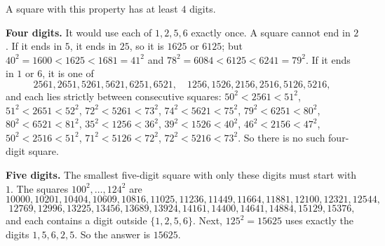 A square with this property has at least $4$ digits.

\textbf{Four digits.} It would use each of $1,2,5,6$ exactly once. A square cannot end in $2$. If it ends in $5$, it ends in $25$, so it is $1625$ or $6125$; but $40^2=1600<1625<1681=41^2$ and $78^2=6084<6125<6241=79^2$. If it ends in $1$ or $6$, it is one of
\[
2561,2651,5261,5621,6251,6521,\quad 1256,1526,2156,2516,5126,5216,
\]
and each lies strictly between consecutive squares:
$50^2<2561<51^2$, $51^2<2651<52^2$, $72^2<5261<73^2$, $74^2<5621<75^2$, $79^2<6251<80^2$, $80^2<6521<81^2$, $35^2<1256<36^2$, $39^2<1526<40^2$, $46^2<2156<47^2$, $50^2<2516<51^2$, $71^2<5126<72^2$, $72^2<5216<73^2$. So there is no such four-digit square.

\textbf{Five digits.} The smallest five-digit square with only these digits must start with $1$. The squares $100^2,\dots,124^2$ are
\[
10000,10201,10404,10609,10816,11025,11236,11449,11664,11881,12100,12321,12544,
\]
\[
12769,12996,13225,13456,13689,13924,14161,14400,14641,14884,15129,15376,
\]
and each contains a digit outside $\{1,2,5,6\}$. Next, $125^2=15625$ uses exactly the digits $1,5,6,2,5$. So the answer is $\boxed{15625}$.
